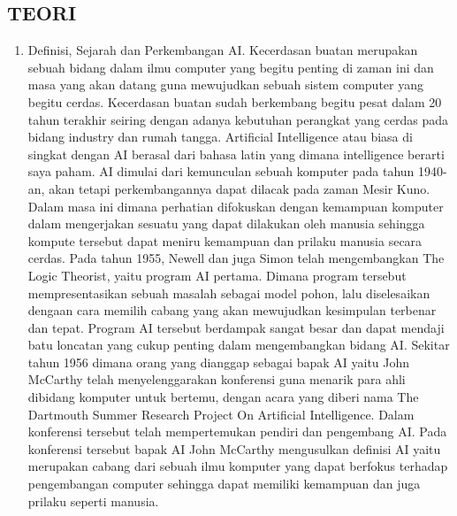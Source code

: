 \subsection{TEORI}
\begin {enumerate}
\item
Definisi, Sejarah dan Perkembangan AI.
\subitem
Kecerdasan buatan merupakan sebuah bidang dalam ilmu computer yang begitu penting di zaman ini dan masa yang akan datang guna mewujudkan sebuah sistem computer yang begitu cerdas. Kecerdasan buatan sudah berkembang begitu pesat dalam 20 tahun terakhir seiring dengan adanya kebutuhan perangkat yang cerdas pada bidang industry dan rumah tangga.
\subitem
Artificial Intelligence atau biasa di singkat dengan AI berasal dari bahasa latin yang dimana intelligence berarti saya paham. AI dimulai dari kemunculan sebuah komputer pada tahun 1940-an, akan tetapi perkembangannya dapat dilacak pada zaman Mesir Kuno. Dalam masa ini dimana perhatian difokuskan dengan kemampuan komputer dalam mengerjakan sesuatu yang dapat dilakukan oleh manusia sehingga kompute tersebut dapat meniru kemampuan dan prilaku manusia secara cerdas.
\subitem
Pada tahun 1955, Newell dan juga Simon telah mengembangkan The Logic Theorist, yaitu program AI pertama. Dimana program tersebut mempresentasikan sebuah masalah sebagai model pohon, lalu diselesaikan dengaan cara memilih cabang yang akan mewujudkan kesimpulan terbenar dan tepat. Program AI tersebut berdampak sangat besar dan dapat mendaji batu loncatan yang cukup penting dalam mengembangkan bidang AI. Sekitar tahun 1956 dimana orang yang dianggap sebagai bapak AI yaitu John McCarthy telah menyelenggarakan konferensi guna menarik para ahli dibidang komputer untuk bertemu, dengan acara yang diberi nama The Dartmouth Summer Research Project On Artificial Intelligence. Dalam konferensi tersebut telah mempertemukan pendiri dan pengembang AI. Pada konferensi tersebut bapak AI John McCarthy mengusulkan definisi AI yaitu merupakan cabang dari sebuah ilmu komputer yang dapat berfokus terhadap pengembangan computer sehingga dapat memiliki kemampuan dan juga prilaku seperti manusia.\cite{ai2011kecerdasan}


\end{enumerate}

